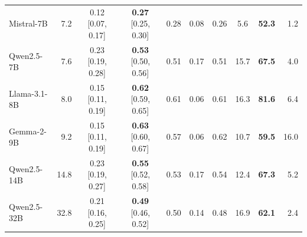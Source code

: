 \begin{table}[t]
{\begin{tabular}{@{}lrcccccccr@{}}
Mistral-7B & 7.2 & 0.12 {\scriptsize[0.07, 0.17]} & {\bf 0.27} {\scriptsize[0.25, 0.30]} & 0.28 & 0.08 & 0.26 & 5.6 & {\bf 52.3} & 1.2 \\
Qwen2.5-7B & 7.6 & 0.23 {\scriptsize[0.19, 0.28]} & {\bf 0.53} {\scriptsize[0.50, 0.56]} & 0.51 & 0.17 & 0.51 & 15.7 & {\bf 67.5} & 4.0 \\
Llama-3.1-8B & 8.0 & 0.15 {\scriptsize[0.11, 0.19]} & {\bf 0.62} {\scriptsize[0.59, 0.65]} & 0.61 & 0.06 & 0.61 & 16.3 & {\bf 81.6} & 6.4 \\
Gemma-2-9B & 9.2 & 0.15 {\scriptsize[0.11, 0.19]} & {\bf 0.63} {\scriptsize[0.60, 0.67]} & 0.57 & 0.06 & 0.62 & 10.7 & {\bf 59.5} & 16.0 \\
Qwen2.5-14B & 14.8 & 0.23 {\scriptsize[0.19, 0.27]} & {\bf 0.55} {\scriptsize[0.52, 0.58]} & 0.53 & 0.17 & 0.54 & 12.4 & {\bf 67.3} & 5.2 \\
Qwen2.5-32B & 32.8 & 0.21 {\scriptsize[0.16, 0.25]} & {\bf 0.49} {\scriptsize[0.46, 0.52]} & 0.50 & 0.14 & 0.48 & 16.9 & {\bf 62.1} & 2.4 \\
\bottomrule
\end{tabular}}
\end{table}
